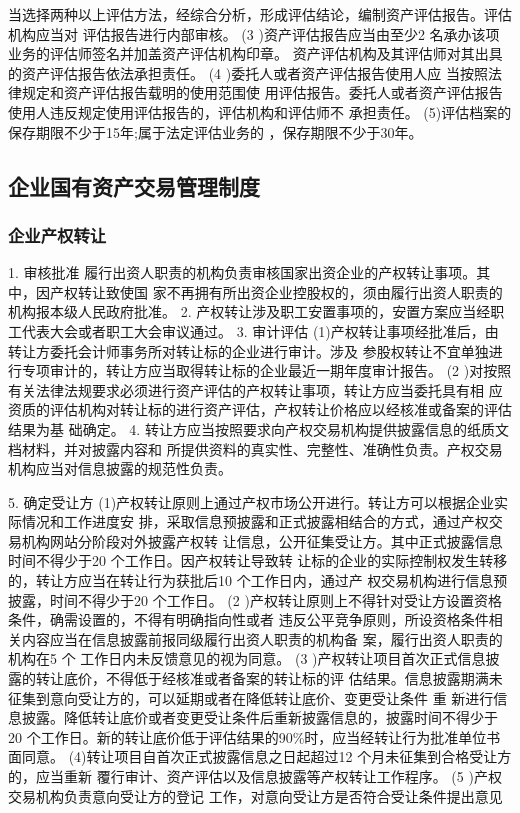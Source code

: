 \documentclass[UTF8,12pt]{ctexart}
\numberwithin{equation}{section} %
\numberwithin{figure}{section}
\numberwithin{table}{section}
\begin{document}
	
	当选择两种以上评估方法，经综合分析，形成评估结论，编制资产评估报告。评估机构应当对
	评估报告进行内部审核。
	(3 )资产评估报告应当由至少2 名承办该项业务的评估师签名并加盖资产评估机构印章。
	资产评估机构及其评估师对其出具的资产评估报告依法承担责任。
	(4 )委托人或者资产评估报告使用人应 当按照法律规定和资产评估报告载明的使用范围使
	用评估报告。委托人或者资产评估报告使用人违反规定使用评估报告的，评估机构和评估师不
	承担责任。
	(5)评估档案的保存期限不少于15年;属于法定评估业务的 ，保存期限不少于30年。
	
	\subsection{企业国有资产交易管理制度}
	
	\subsubsection{企业产权转让}
	1. 审核批准
	履行出资人职责的机构负责审核国家出资企业的产权转让事项。其中，因产权转让致使国
	家不再拥有所出资企业控股权的，须由履行出资人职责的机构报本级人民政府批准。
	2. 产权转让涉及职工安置事项的，安置方案应当经职工代表大会或者职工大会审议通过。
	3. 审计评估
	(1)产权转让事项经批准后，由转让方委托会计师事务所对转让标的企业进行审计。涉及
	参股权转让不宜单独进行专项审计的，转让方应当取得转让标的企业最近一期年度审计报告。
	(2 )对按照有关法律法规要求必须进行资产评估的产权转让事项，转让方应当委托具有相
	应资质的评估机构对转让标的进行资产评估，产权转让价格应以经核准或备案的评估结果为基
	础确定。
	4. 转让方应当按照要求向产权交易机构提供披露信息的纸质文档材料，并对披露内容和
	所提供资料的真实性、完整性、准确性负责。产权交易机构应当对信息披露的规范性负责。
	

	5. 确定受让方
	(1)产权转让原则上通过产权市场公开进行。转让方可以根据企业实际情况和工作进度安
	排，采取信息预披露和正式披露相结合的方式，通过产权交易机构网站分阶段对外披露产权转
	让信息，公开征集受让方。其中正式披露信息时间不得少于20 个工作日。因产权转让导致转
	让标的企业的实际控制权发生转移的，转让方应当在转让行为获批后10 个工作日内，通过产
	权交易机构进行信息预披露，时间不得少于20 个工作日。
	(2 )产权转让原则上不得针对受让方设置资格条件，确需设置的，不得有明确指向性或者
	违反公平竞争原则，所设资格条件相关内容应当在信息披露前报同级履行出资人职责的机构备
	案，履行出资人职责的机构在5 个 工作日内未反馈意见的视为同意。
	(3 )产权转让项目首次正式信息披露的转让底价，不得低于经核准或者备案的转让标的评
	估结果。信息披露期满未征集到意向受让方的，可以延期或者在降低转让底价、变更受让条件
	重 新进行信息披露。降低转让底价或者变更受让条件后重新披露信息的，披露时间不得少于
	20 个工作日。新的转让底价低于评估结果的90\%时，应当经转让行为批准单位书面同意。
	(4)转让项目自首次正式披露信息之日起超过12 个月未征集到合格受让方的，应当重新
	覆行审计、资产评估以及信息披露等产权转让工作程序。
	(5 )产权交易机构负责意向受让方的登记 工作，对意向受让方是否符合受让条件提出意见
	
\end{document}
